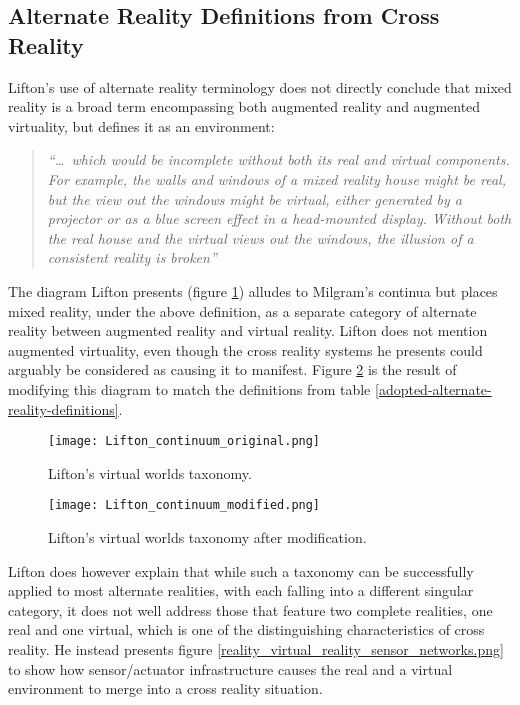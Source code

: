 \subsection{Alternate Reality Definitions from Cross Reality}

Lifton's use of alternate reality terminology does not directly conclude that mixed reality is a broad term encompassing both augmented reality and augmented virtuality, but defines it as an environment:

\begin{quote}
	\textit{``\ldots\ which would be incomplete without both its real and virtual components. For example, the walls and windows of a mixed reality house might be real, but the view out the windows might be virtual, either generated by a projector or as a blue screen effect in a head-mounted display. Without both the real house and the virtual views out the windows, the illusion of a consistent reality is broken''}~\cite{Lifton2007a}
\end{quote}

The diagram Lifton presents (figure \ref{original_lifton_axis.png}) alludes to Milgram's continua but places mixed reality, under the above definition, as a separate category of alternate reality between augmented reality and virtual reality. Lifton does not mention augmented virtuality, even though the cross reality systems he presents could arguably be considered as causing it to manifest. Figure \ref{modified_lifton_axis.png} is the result of modifying this diagram to match the definitions from table \ref{adopted-alternate-reality-definitions}.

\begin{figure}[h]
	\centering
	\texttt{[image: Lifton\_continuum\_original.png]}
	\caption{Lifton's virtual worlds taxonomy.}
	\label{original_lifton_axis.png}
\end{figure}

\begin{figure}[h]
	\centering
	\texttt{[image: Lifton\_continuum\_modified.png]}
	\caption{Lifton's virtual worlds taxonomy after modification.}
	\label{modified_lifton_axis.png}
\end{figure}

Lifton does however explain that while such a taxonomy can be successfully applied to most alternate realities, with each falling into a different singular category, it does not well address those that feature two complete realities, one real and one virtual, which is one of the distinguishing characteristics of cross reality. He instead presents figure \ref{reality_virtual_reality_sensor_networks.png} to show how sensor/actuator infrastructure causes the real and a virtual environment to merge into a cross reality situation.

